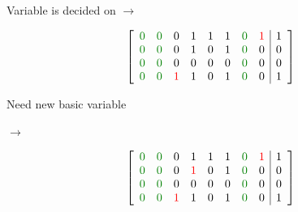 \documentclass[aspectratio=196]{slides}
\begin{document}
\begin{minipage}{0.2\linewidth}
\centering
Variable is decided on $\rightarrow$
\end{minipage}
\begin{minipage}{0.3\linewidth}
\[
\left[
\begin{array}{llllllll|l}
\color{darkgreen}0 & \color{darkgreen}0 &           0 & 1 & 1 & 1 & \color{darkgreen}0 & \color{red}1 & 1\\
\color{darkgreen}0 & \color{darkgreen}0 &           0 & 1 & 0 & 1 & \color{darkgreen}0 & 0 & 0\\
\color{darkgreen}0 & \color{darkgreen}0 &           0 & 0 & 0 & 0 & \color{darkgreen}0 & 0 & 0\\
\color{darkgreen}0 & \color{darkgreen}0 &\color{red}1 & 1 & 0 & 1 & \color{darkgreen}0 & 0 & 1\\
\end{array}
\right]
\]
\end{minipage}
%
\begin{minipage}{0.2\linewidth}
\centering
Need new basic variable

$\rightarrow$
\end{minipage}
%
\begin{minipage}{0.3\linewidth}
\[
\left[
\begin{array}{llllllll|l}
\color{darkgreen}0 & \color{darkgreen}0 &           0 & 1 & 1 & 1 & \color{darkgreen}0 & \color{red}1 & 1\\
\color{darkgreen}0 & \color{darkgreen}0 &           0 & \color{red}1 & 0 & 1 & \color{darkgreen}0 & 0 & 0\\
\color{darkgreen}0 & \color{darkgreen}0 &           0 & 0 & 0 & 0 & \color{darkgreen}0 & 0 & 0\\
\color{darkgreen}0 & \color{darkgreen}0 &\color{red}1 & 1 & 0 & 1 & \color{darkgreen}0 & 0 & 1\\
\end{array}
\right]
\]
\end{minipage}
\end{document}
